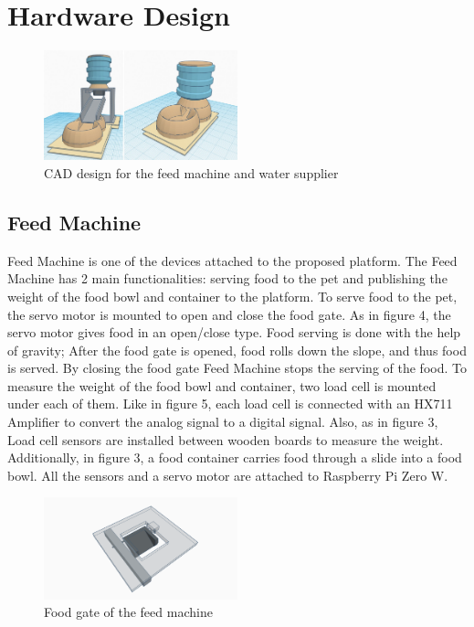 \documentclass[conference]{IEEEtran}
\begin{document}
\section{Hardware Design}
\begin{figure}[htbp]
\centerline{\includegraphics[width=0.5\textwidth]{./images/Feed Machine & Water Supplier.jpg}}
\caption{CAD design for the feed machine and water supplier}
\label{fig}
\end{figure}

\subsection{Feed Machine}
Feed Machine is one of the devices attached to the proposed platform. The Feed Machine has 2 main functionalities: serving food to the pet and publishing the weight of the food bowl and container to the platform. To serve food to the pet, the servo motor is mounted to open and close the food gate. As in figure 4, the servo motor gives food in an open/close type. Food serving is done with the help of gravity; After the food gate is opened, food rolls down the slope, and thus food is served. By closing the food gate Feed Machine stops the serving of the food. To measure the weight of the food bowl and container, two load cell is mounted under each of them. Like in figure 5, each load cell is connected with an HX711 Amplifier to convert the analog signal to a digital signal. Also, as in figure 3, Load cell sensors are installed between wooden boards to measure the weight. Additionally, in figure 3, a food container carries food through a slide into a food bowl. All the sensors and a servo motor are attached to Raspberry Pi Zero W.

\begin{figure}[htbp]
\centerline{\includegraphics[width=0.5\textwidth]{./images/servo_gate.png}}
\caption{Food gate of the feed machine}
\label{fig}
\end{figure}
\end{document}
